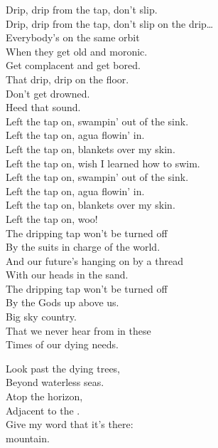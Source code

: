 Drip, drip from the tap, don't slip. \\
Drip, drip from the tap, don't slip on the drip… \\

Everybody's on the same orbit \\
When they get old and moronic. \\
Get complacent and get bored. \\
That drip, drip on the floor. \\
Don't get drowned. \\
Heed that sound. \\

Left the tap on, swampin' out of the sink. \\
Left the tap on, agua flowin' in. \\
Left the tap on, blankets over my skin. \\
Left the tap on, wish I learned how to swim. \\

Left the tap on, swampin' out of the sink. \\
Left the tap on, agua flowin' in. \\
Left the tap on, blankets over my skin. \\
Left the tap on, woo! \\

The dripping tap won't be turned off \\
By the suits in charge of the world. \\
And our future's hanging on by a thread \\
With our heads in the sand. \\

The dripping tap won't be turned off \\
By the Gods up above us. \\
Big sky country. \\
That we never hear from in these \\
Times of our dying needs. \\





Look past the dying trees, \\
Beyond waterless seas. \\
Atop the horizon, \\
Adjacent to the . \\
Give my word that it's there: \\
 mountain. \\

